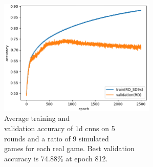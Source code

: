 \begin{minipage}{0.5\textwidth}
	\begin{figure}[H]
		\centering
		\includegraphics[width=7.5cm]{images/bestHistories/1d_10s_sd9x_acc.png}
		\caption[Bild kurz]{Average training and \\\hspace{0\textwidth}validation accuracy of 1d cnns on 5\\\hspace{0\textwidth} rounds and a ratio of 9 simulated  \\\hspace{0\textwidth}games for each real game. Best validation \\\hspace{0\textwidth}accuracy is 74.88\% at epoch 812.}
		\label{fig:1d10}
	\end{figure}
\end{minipage}
